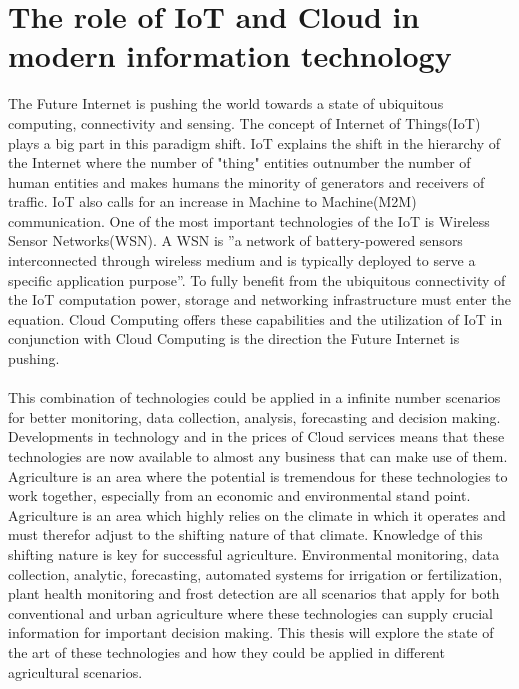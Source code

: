 \documentclass[]{uiophd}
\begin{document}
\section{The role of IoT and Cloud in modern information technology}
The Future Internet is pushing the world towards a state of ubiquitous computing, connectivity and sensing. The concept of Internet of Things(IoT) plays a big part in this paradigm shift. IoT explains the shift in the hierarchy of the Internet where the number of "thing" entities outnumber the number of human entities and makes humans the minority of generators and receivers of traffic. IoT also calls for an increase in Machine to Machine(M2M) communication. One of the most important technologies of the IoT is Wireless Sensor Networks(WSN). A WSN is ''a network of battery-powered sensors interconnected through wireless medium and is typically deployed to serve a specific application purpose''\cite{Ojha2015662}. To fully benefit from the ubiquitous connectivity of the IoT computation power, storage and networking infrastructure must enter the equation. Cloud Computing offers these capabilities and the utilization of IoT in conjunction with Cloud Computing is the direction the Future Internet is pushing. 
\\\\
This combination of technologies could be applied in a infinite number scenarios for better monitoring, data collection, analysis, forecasting and decision making. Developments in technology and in the prices of Cloud services means that these technologies are now available to almost any business that can make use of them. Agriculture is an area where the potential is tremendous for these technologies to work together, especially from an economic and environmental stand point. Agriculture is an area which highly relies on the climate in which it operates and must therefor adjust to the shifting nature of that climate. Knowledge of this shifting nature is key for successful agriculture. Environmental monitoring, data collection, analytic, forecasting, automated systems for irrigation or fertilization, plant health monitoring and frost detection are all scenarios that apply for both conventional and urban agriculture where these technologies can supply crucial information for important decision making. This thesis will explore the state of the art of these technologies and how they could be applied in different agricultural scenarios.
\end{document}
